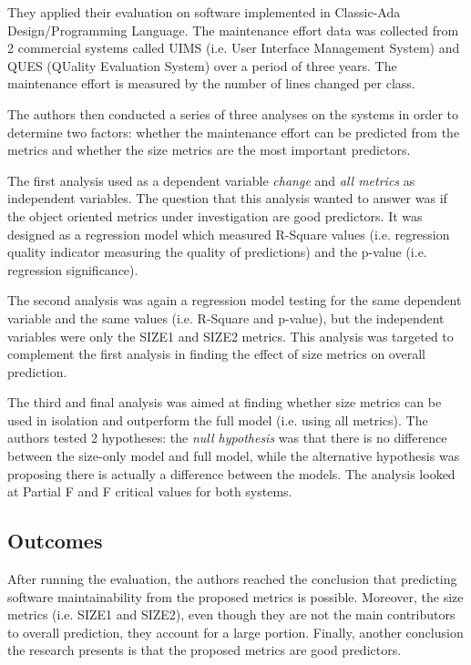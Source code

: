 \documentclass[a4paper,portrait,12pt]{article}
\begin{document}
They applied their evaluation on software implemented in Classic-Ada 
Design/Programming Language. The maintenance effort data was collected from
2 commercial systems called UIMS (i.e. User Interface Management System)
and QUES (QUality Evaluation System) over a period of three years. The 
maintenance effort is measured by the number of lines changed per class.

The authors then conducted a series of three analyses on the systems in order
to determine two factors: whether the maintenance effort can be predicted from the
metrics and whether the size metrics are the most important predictors.

The first analysis used as a dependent variable \emph{change} and \emph{all metrics}
as independent variables. The question that this analysis wanted to answer was if 
the object oriented metrics under investigation are good predictors. It was designed
as a regression model which measured R-Square values (i.e. regression quality
indicator measuring the quality of predictions) and the p-value (i.e. regression
significance).

The second analysis was again a regression model testing for the same dependent 
variable and the same values (i.e. R-Square and p-value), but the independent 
variables were only the SIZE1 and SIZE2 metrics. This analysis was targeted to 
complement the first analysis in finding the effect of size metrics on overall 
prediction.

The third and final analysis was aimed at finding whether size metrics can be used
in isolation and outperform the full model (i.e. using all metrics). The authors
tested 2 hypotheses: the \emph{null hypothesis} was that there is no difference 
between the size-only model and full model, while the alternative hypothesis was
proposing there is actually a difference between the models. The analysis looked at
Partial F and F critical values for both systems.

\subsection{Outcomes}

After running the evaluation, the authors reached the conclusion that predicting
software maintainability from the proposed metrics is possible. Moreover, the size
metrics (i.e. SIZE1 and SIZE2), even though they are not the main contributors to
overall prediction, they account for a large portion. Finally, another conclusion
the research presents is that the proposed metrics are good predictors.
\end{document}
